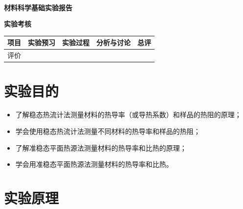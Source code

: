 \documentclass[a4paper,utf8]{article}
\begin{document}
\begin{center}
    {\mbox{}\\[7em]\bfseries\songti%
    材料科学基础实验报告}\\[34mm]
    {\bfseries\songti
    实验考核\\[3mm]
    \extrarowheight=3mm
    \begin{tabularx}{150mm}{|X|X|X|X|X|}\hline
        \hfil 项目 \hfil  & \hfil 实验预习 \hfil & \hfil 实验过程 \hfil & \hfil 分析与讨论 \hfil & \hfil 总评 \hfil \\[3mm] \hline
        \hfil 评价 \hfil &  &  &  &  \\[3mm] \hline
    \end{tabularx}
    }
\end{center}\newpage
\newpage
\section{实验目的}
    \begin{itemize}
        \item 了解稳态热流计法测量材料的热导率（或导热系数）和样品的热阻的原理；
        \item 学会使用稳态热流计法测量不同材料的热导率和样品的热阻；
        \item 了解准稳态平面热源法测量材料的热导率和比热的原理；
        \item 学会用准稳态平面热源法测量材料的热导率和比热。
    \end{itemize}
\section{实验原理}%
\end{document}
